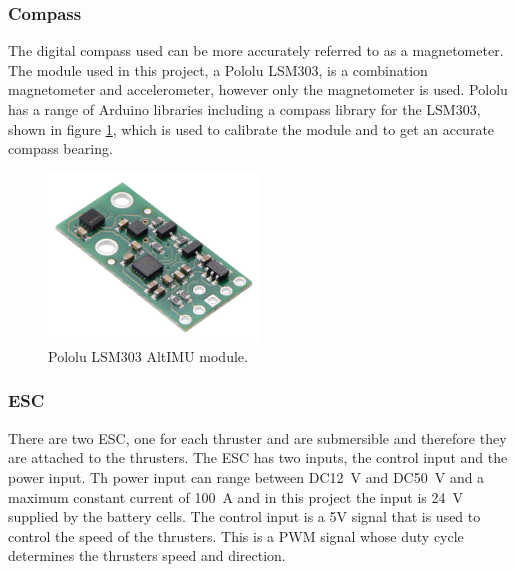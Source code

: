 		\subsubsection{Compass}
		The digital compass used can be more accurately referred to as a magnetometer. The module used in this project, a  Pololu LSM303, is a combination magnetometer and accelerometer, however only the magnetometer is used. Pololu has a range of Arduino libraries including a compass library for the LSM303, shown in figure \ref{fig:3:compass}, which is used to calibrate the module and to get an accurate compass bearing. 
		\begin{figure}[hb]
			\begin{center}
				\includegraphics[width = 0.5\textwidth]{figures/compass.jpg}
				\caption{Pololu LSM303 AltIMU module.}
				\label{fig:3:compass}
			\end{center}
		\end{figure}
		\subsubsection{ESC}
		There are two ESC, one for each thruster and are submersible and therefore they are attached to the thrusters. The ESC has two inputs, the control input and the power input. Th power input can range between DC\SI{12}{\volt} and DC\SI{50}{\volt} and a maximum constant current of \SI{100}{\ampere} and in this project the input is \SI{24}{\volt} supplied by the battery cells. The control input is a 5V signal that is used to control the speed of the thrusters. This is a PWM signal whose duty cycle determines the thrusters speed and direction. 
